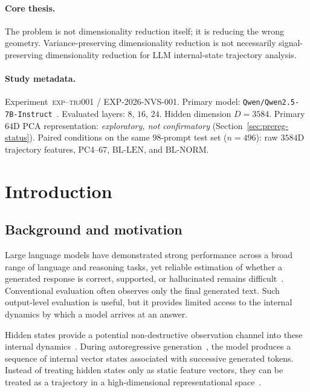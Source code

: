 \documentclass{article}
\newcommand{\bllen}{\mathrm{BL\text{-}LEN}}
\newcommand{\blnorm}{\mathrm{BL\text{-}NORM}}
\newcommand{\exptag}{\textsc{exp--trj001}}
\begin{document}
\paragraph{Core thesis.}
The problem is not dimensionality reduction itself; it is reducing the wrong geometry. Variance-preserving dimensionality reduction is not necessarily signal-preserving dimensionality reduction for {LLM} internal-state trajectory analysis.

\paragraph{Study metadata.}
Experiment~\exptag{} / {EXP-2026-NVS-001}. Primary model: \texttt{Qwen/Qwen2.5-7B-Instruct}~\citep{qwen25,yang2024qwen2}. Evaluated layers: $8$, $16$, $24$. Hidden dimension $D=3584$. Primary $64${D} {PCA} representation: \emph{exploratory, not confirmatory} (Section~\ref{sec:prereg-status}). Paired conditions on the same $98$-prompt test set ($n=496$): raw $3584${D} trajectory features, {PC4}--{67}, $\bllen$, and $\blnorm$.

\section{Introduction}
\label{sec:intro}

\subsection{Background and motivation}
\label{sec:intro-bg}

Large language models have demonstrated strong performance across a broad range of language and reasoning tasks, yet reliable estimation of whether a generated response is correct, supported, or hallucinated remains difficult~\citep{ji2023survey,huang2025survey}. Conventional evaluation often observes only the final generated text. Such output-level evaluation is useful, but it provides limited access to the internal dynamics by which a model arrives at an answer.

Hidden states provide a potential non-destructive observation channel into these internal dynamics~\citep{azaria2023internal,orgad2024llms,marks2024geometry,chen2024inside}. During autoregressive generation~\citep{vaswani2017}, the model produces a sequence of internal vector states associated with successive generated tokens. Instead of treating hidden states only as static feature vectors, they can be treated as a trajectory in a high-dimensional representational space~\citep{farquhar2024semantic}.
\end{document}
